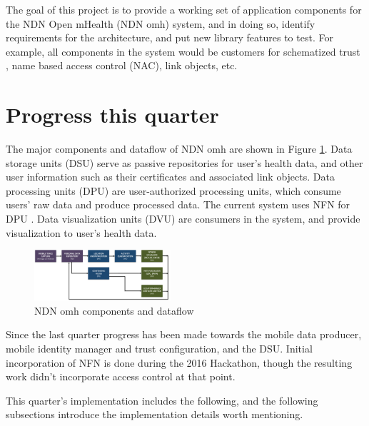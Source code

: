 \documentclass[letterpaper,twocolumn,11pt]{article}
\begin{document}
The goal of this project is to provide a working set of application components for the NDN Open mHealth (NDN omh) system, and in doing so, identify requirements for the architecture, and put new library features to test. For example, all components in the system would be customers for schematized trust \cite{SchematizedTrust}, name based access control (NAC)\cite{NACTR}, link objects, etc.


\section{Progress this quarter}

The major components and dataflow of NDN omh are shown in Figure \ref{fig:dataflow}. Data storage units (DSU) serve as passive repositories for user's health data, and other user information such as their certificates and associated link objects. Data processing units (DPU) are user-authorized processing units, which consume users' raw data and produce processed data. The current system uses NFN for DPU \cite{NFN}. Data visualization units (DVU) are consumers in the system, and provide visualization to user's health data.

\begin{figure}[h]
\centering
\includegraphics[width=0.45\textwidth]{ConceptualBlock.pdf}
\caption{NDN omh components and dataflow \cite{JeffBTechReport}}
\label{fig:dataflow}
\end{figure}

Since the last quarter progress has been made towards the mobile data producer, mobile identity manager and trust configuration, and the DSU. Initial incorporation of NFN is done during the 2016 Hackathon, though the resulting work didn't incorporate access control at that point. 

This quarter's implementation includes the following, and the following subsections introduce the implementation details worth mentioning.
\end{document}
